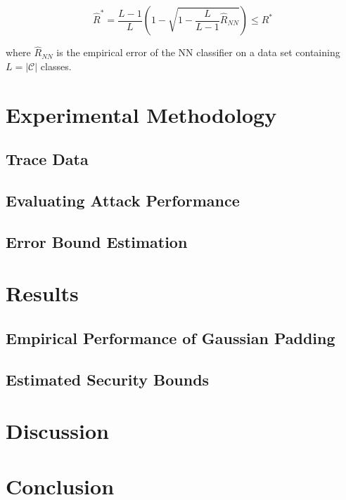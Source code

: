 \documentclass[
	ruledheaders=chapter,
	class=report,
	thesis={type=master, department=inf},
	accentcolor=1c,
	custommargins=true,
	marginpar=false,
	parskip=half-,
	fontsize=11pt,
]{tudapub}
\begin{document}
	\begin{equation}
		\widehat{R}^* = \frac{L - 1}{L} \left(1 - \sqrt{1 - \frac{L}{L-1}\widehat{R}_{NN}}\right) \leq R^*
	\end{equation}
	
	where $\widehat{R}_{NN}$ is the empirical error of the NN classifier on a data set containing $L = |\mathcal{C}|$ classes.

	\chapter{Experimental Methodology}
	\label{methods}

	\section{Trace Data}
	\label{methods:dataset}

	\section{Evaluating Attack Performance}
	\label{pipeline}

	\section{Error Bound Estimation}
	\label{error_bound_estimation}

	\chapter{Results}
	\label{results}

	\section{Empirical Performance of Gaussian Padding}
	\label{performance}

	\section{Estimated Security Bounds}
	\label{security_bounds}

	\chapter{Discussion}
	\label{discussion}

	\chapter{Conclusion}
	\label{conclusion}

	\pagebreak
	\setcounter{page}{5}
	\printbibliography

	\cleardoublepage
	\listoffigures

	\cleardoublepage
	\listoftables
\end{document}
